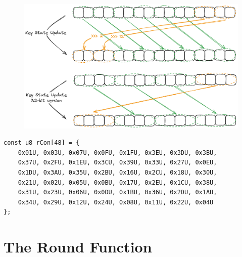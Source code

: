 \begin{figure}[h!]\centering
\includegraphics[scale=.3]{image/key_schedule2.png}
\end{figure}
          
\begin{table}[h]\centering\renewcommand{\arraystretch}{1.25}
\caption{Round Constants generated by 6-bit affine LFSR}
\label{table:round-constants}
\end{table}

\begin{lstlisting}[style=C]
const u8 rCon[48] = {
	0x01U, 0x03U, 0x07U, 0x0FU, 0x1FU, 0x3EU, 0x3DU, 0x3BU,
	0x37U, 0x2FU, 0x1EU, 0x3CU, 0x39U, 0x33U, 0x27U, 0x0EU, 
	0x1DU, 0x3AU, 0x35U, 0x2BU, 0x16U, 0x2CU, 0x18U, 0x30U,
	0x21U, 0x02U, 0x05U, 0x0BU, 0x17U, 0x2EU, 0x1CU, 0x38U, 
	0x31U, 0x23U, 0x06U, 0x0DU, 0x1BU, 0x36U, 0x2DU, 0x1AU,
	0x34U, 0x29U, 0x12U, 0x24U, 0x08U, 0x11U, 0x22U, 0x04U
};
\end{lstlisting}

\newpage
\section{The Round Function}

